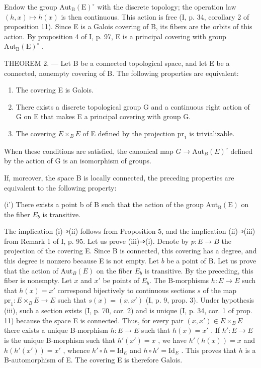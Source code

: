 Endow the group \(\mathrm{Aut}_{\mathrm{B}}(\mathrm{E})^{\circ}\) with the discrete topology; the operation law \((h,x)\mapsto h(x)\) is then continuous. This action is free (I, p. 34, corollary 2 of proposition 11). Since E is a Galois covering of B, its fibers are the orbits of this action. By proposition 4 of I, p. 97, E is a principal covering with group \(\mathrm{Aut}_{\mathrm{B}}(\mathrm{E})^{\circ}\) .

THEOREM 2. --- Let B be a connected topological space, and let E be a connected, nonempty covering of B. The following properties are equivalent:

\begin{enumerate}
\def\labelenumi{(\roman{enumi})}
\item
  The covering E is Galois.
\item
  There exists a discrete topological group G and a continuous right action of G on E that makes E a principal covering with group G.
\item
  The covering \(E \times_{B} E\) of E defined by the projection \(\mathrm{pr}_{1}\) is trivializable.
\end{enumerate}

When these conditions are satisfied, the canonical map \(G \to \mathrm{Aut}_{B}(E)^{\circ}\) defined by the action of G is an isomorphism of groups.

If, moreover, the space B is locally connected, the preceding properties are equivalent to the following property:

(i') There exists a point b of B such that the action of the group \(\mathrm{Aut}_{\mathrm{B}}(\mathrm{E})\) on the fiber \(E_{b}\) is transitive.

The implication (i)⇒(ii) follows from Proposition 5, and the implication (ii)⇒(iii) from Remark 1 of I, p. 95. Let us prove (iii)⇒(i). Denote by \(p\colon E \to B\) the projection of the covering E. Since B is connected, this covering has a degree, and this degree is nonzero because E is not empty. Let \(b\) be a point of B. Let us prove that the action of \(\mathrm{Aut}_{B}(E)\) on the fiber \(E_{b}\) is transitive. By the preceding, this fiber is nonempty. Let \(x\) and \(x'\) be points of \(E_{b}\). The B-morphisms \(h\colon E \to E\) such that \(h(x) = x'\) correspond bijectively to continuous sections \(s\) of the map \(\mathrm{pr}_{1}\colon E \times_{B} E \to E\) such that \(s(x) = (x, x')\) (I, p. 9, prop. 3). Under hypothesis (iii), such a section exists (I, p. 70, cor. 2) and is unique (I, p. 34, cor. 1 of prop. 11) because the space E is connected. Thus, for every pair \((x, x') \in E \times_{B} E\) there exists a unique B-morphism \(h\colon E \to E\) such that \(h(x) = x'\) . If \(h'\colon E \to E\) is the unique B-morphism such that \(h'(x') = x\) , we have \(h'(h(x)) = x\) and \(h(h'(x')) = x'\) , whence \(h' \circ h = \text{Id}_E\) and \(h \circ h' = \text{Id}_E\) . This proves that \(h\) is a B-automorphism of E. The covering E is therefore Galois.

